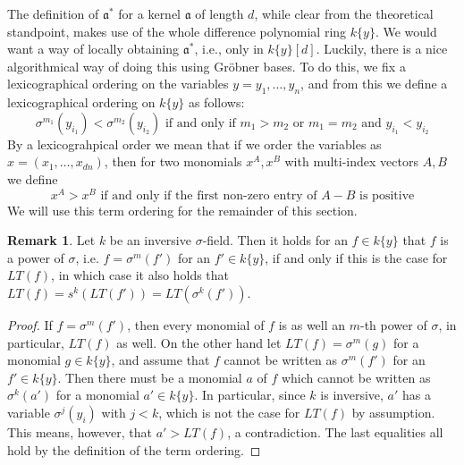 \documentclass{article}
\def\a{\mathfrak{a}}
\def\s{\sigma}
\newenvironment{bew}{\begin{proof}[Proof]}{\end{proof}}
\theoremstyle{definition}
\newtheorem{rem}[Satz]{Remark}
\begin{document}
The definition of $\a^*$ for a kernel $\a$ of length $d$, while clear from the theoretical standpoint, makes use of the whole difference polynomial ring $k\{y\}$. 
We would want a way of locally obtaining $\a^*$, i.e., only in $k\{y\}[d]$. Luckily, there is a nice algorithmical way of doing this using Gröbner bases.
To do this, we fix a lexicographical ordering on the variables $y = y_1, \ldots, y_n$, and from this we define a lexicographical ordering on $k\{y\}$ as follows:
\[ \s^{m_1}(y_{i_1}) < \s^{m_2}(y_{i_2})\text{ if and only if }m_1 > m_2\text{ or }m_1 = m_2\text{ and }y_{i_1} < y_{i_2} \]
 By a lexicograhpical order we mean that if we order the variables as $x = (x_1,\ldots,x_{dn})$, then for two monomials $x^A, x^B$ with multi-index vectors $A,B$ we define
\[ x^A > x^B \text{ if and only if the first non-zero entry of } A-B \text{ is positive} \]
We will use this term ordering for the remainder of this section.
\begin{rem}\label{remorder}
Let $k$ be an inversive $\s$-field. Then it holds for an $f \in k\{y\}$ that $f$ is a power of $\s$, i.e. $f = \s^m(f')$ for an $f' \in k\{y\}$,
if and only if this is the case for $LT(f)$, in which case it also holds that $LT(f) = s^k(LT(f')) = LT(\s^k(f'))$.
\begin{bew}
If $f =  \s^m(f')$, then every monomial of $f$ is as well an $m$-th power of $\s$, in particular, $LT(f)$ as well.
On the other hand let $LT(f) = \s^m(g)$ for a monomial $g \in k\{y\}$, and assume that $f$ cannot be written as $\s^m(f')$ for an $f' \in k\{y\}$. 
Then there must be a monomial $a$ of $f$ which cannot be written as $\s^k(a')$ for a monomial $a' \in k\{y\}$. In particular, since $k$ is inversive, $a'$ has a variable $\s^j(y_i)$ with $j < k$,
which is not the case for $LT(f)$ by assumption. This means, however, that $a' > LT(f)$, a contradiction. 
The last equalities all hold by the definition of the term ordering.
\end{bew}
\end{rem}
\end{document}
